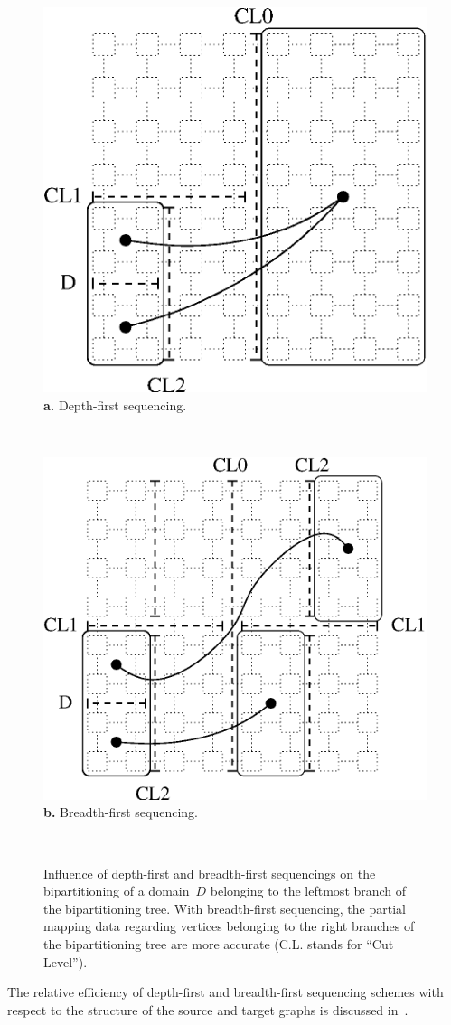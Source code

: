 \begin{figure}[hbt]
\hfill
\parbox[b]{5.2cm}{
\hfill
\includegraphics[scale=0.40]{s_f_run.eps}
\hfill\\
\textbf{a.} Depth-first sequencing.
}\ \hfill\
\parbox[b]{5.2cm}{
\hfill
\includegraphics[scale=0.40]{s_f_ruy.eps}
\hfill\\
\textbf{b.} Breadth-first sequencing.
}\hfill\ %
\caption%
{Influence of depth-first and breadth-first sequencings on the
 bipartitioning of a domain~$D$ belonging to the leftmost branch of
 the bipartitioning tree.
 With breadth-first sequencing, the partial mapping data regarding vertices
 belonging to the right branches of the bipartitioning tree are more
 accurate (C.L. stands for ``Cut Level'').}
\label{fig-biprub}
\end{figure}
The relative efficiency of depth-first and breadth-first sequencing schemes
with respect to the structure of the source and target graphs is discussed
in~\cite{pero96b}.

